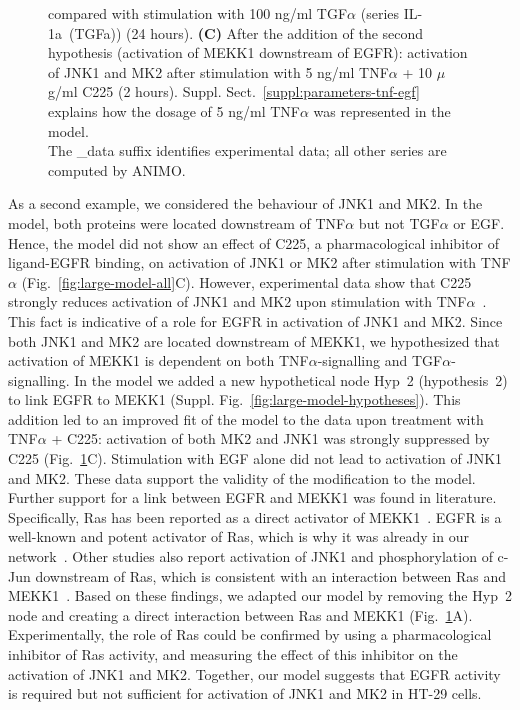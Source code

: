 \documentclass{bmcart}
\begin{document}
\begin{figure}[!htpb]
{compared with stimulation with 100 ng/ml TGF$\alpha$ (series {\sf IL-1a~(TGFa)}) (24 hours).
{\bf(C)} %
After the addition of the second hypothesis (activation of MEKK1 downstream of EGFR):
activation of JNK1 and MK2 after
stimulation with 5 ng/ml TNF$\alpha$ + 10 $\mu$g/ml C225 (2 hours).
Suppl. Sect.~\ref{suppl:parameters-tnf-egf} explains how the dosage of 5 ng/ml TNF$\alpha$ was represented in the model.\\
The {\sf \_{}data} suffix identifies experimental data; all other series are computed by ANIMO.}\label{fig:large-model-complete}
\end{figure}




As a second example, we considered the behaviour of JNK1 and MK2. In the model, both
proteins were located downstream of TNF$\alpha$ but not TGF$\alpha$ or EGF. Hence, the
model did not show an effect of C225, a pharmacological inhibitor of ligand-EGFR
binding, on activation of JNK1 or MK2 after stimulation with TNF$\alpha$ (Fig.~\ref{fig:large-model-all}C). However, experimental
data show that C225 strongly reduces activation of JNK1 and MK2 upon stimulation with
TNF$\alpha$~\cite{pathway-autocrine}.
This fact is indicative of a role for EGFR in activation of JNK1 and MK2. Since both JNK1 and MK2
are located downstream of MEKK1, we hypothesized that activation
of MEKK1 is dependent on
both TNF$\alpha$-signalling and TGF$\alpha$-signalling. In the model we added a new
hypothetical node {\sf Hyp~2} (hypothesis~2) to link EGFR to MEKK1 (Suppl. Fig.~\ref{fig:large-model-hypotheses}).
This addition led to an improved fit of the model to the data upon treatment with TNF$\alpha$ + C225:
activation of both MK2 and JNK1 was strongly suppressed by C225 (Fig.~\ref{fig:large-model-complete}C).
Stimulation with EGF alone did not lead to activation of JNK1 and MK2.
These data support the validity of the modification to the model.
Further support for a link between EGFR and MEKK1 was found in literature. Specifically,
Ras has been reported as a direct activator of
MEKK1~\cite{ras-mekk1}. EGFR is a well-known and potent activator of Ras,
which is why it was already in our network~\cite{kegg}.
Other studies also report activation of JNK1 and phosphorylation of c-Jun downstream of Ras, which is consistent with
an interaction between Ras and MEKK1~\cite{cfos-cjun,ras-jnk1}.
Based on these findings, we adapted
our model by removing the {\sf Hyp~2} node and creating a direct interaction between Ras
and MEKK1 (Fig.~\ref{fig:large-model-complete}A). Experimentally, the role of Ras could be confirmed by using a
pharmacological inhibitor of Ras activity, and measuring the effect of this inhibitor on the activation of JNK1 and MK2.
Together, our model suggests that EGFR activity is required
but not sufficient for activation of JNK1 and MK2 in HT-29 cells.
\end{document}
